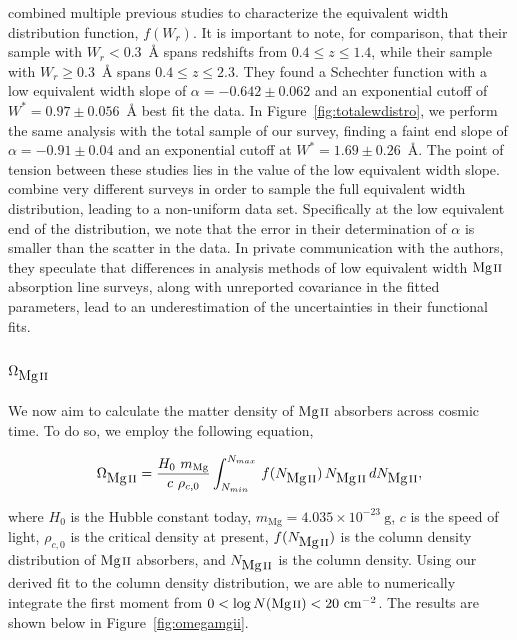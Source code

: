 \documentclass[iop,apj,numberedappendix,appendixfloats,twocolappendix]{emulateapj}
\begin{document}
\cite{Kacprzak2011MgII} combined multiple previous studies to characterize the equivalent width distribution function, $f(W_r)$. It is important to note, for comparison, that their sample with $W_r < 0.3$~{\AA} spans redshifts from $0.4 \le z \le 1.4$, while their sample with $W_r \ge 0.3$~{\AA} spans $0.4 \le z \le 2.3$. They found a Schechter function with a low equivalent width slope of $\alpha = -0.642 \pm 0.062$ and an exponential cutoff of $W^* = 0.97 \pm 0.056$~{\AA} best fit the data. In Figure~\ref{fig:totalewdistro}, we perform the same analysis with the total sample of our survey, finding a faint end slope of $\alpha = -0.91 \pm 0.04$ and an exponential cutoff at $W^* = 1.69 \pm 0.26$~{\AA}. The point of tension between these studies lies in the value of the low equivalent width slope. \cite{Kacprzak2011MgII} combine very different surveys in order to sample the full equivalent width distribution, leading to a non-uniform data set. Specifically at the low equivalent end of the distribution, we note that the error in their determination of $\alpha$ is smaller than the scatter in the data. In private communication with the authors, they speculate that differences in analysis methods of low equivalent width ${\hbox{{\rm Mg}\kern 0.1em{\sc ii}}}$ absorption line surveys, along with unreported covariance in the fitted parameters, lead to an underestimation of the uncertainties in their functional fits. 

\subsection{$\Omega_{\hbox{{\rm Mg}\kern 0.1em{\sc ii}}}$}
\label{omegamgii}

We now aim to calculate the matter density of ${\hbox{{\rm Mg}\kern 0.1em{\sc ii}}}$ absorbers across cosmic time. To do so, we employ the following equation,

\begin{equation}
\Omega_{\MgII} = \frac{H_0\  m_{\mathrm{Mg}}}{c\ \rho_{c,0}} \int_{N_{min}}^{N_{max}}\, f (N_{\MgII})\, N_{\MgII}\, dN_{\MgII} ,
\label{eqn:omega}
\end{equation}

\noindent where $H_0$ is the Hubble constant today, $m_{\mathrm{Mg}} = 4.035 \times 10^{-23}~\mathrm{g}$, $c$ is the speed of light, $\rho_{c,0}$ is the critical density at present, $f(N_{\hbox{{\rm Mg}\kern 0.1em{\sc ii}}})$ is the column density distribution of ${\hbox{{\rm Mg}\kern 0.1em{\sc ii}}}$ absorbers, and $N_{\hbox{{\rm Mg}\kern 0.1em{\sc ii}}}$ is the column density. Using our derived fit to the column density distribution, we are able to numerically integrate the first moment from $0 < \log N({\hbox{{\rm Mg}\kern 0.1em{\sc ii}}}) < 20~\mathrm{cm^{-2}}$. The results are shown below in Figure~\ref{fig:omegamgii}. 
\end{document}
